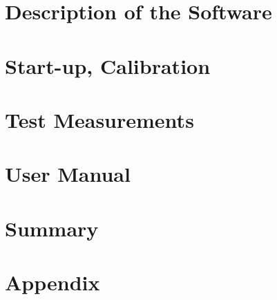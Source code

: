 \documentclass[12pt]{article}
\begin{document}
	\section{Description of the Software}
	
	\section{Start-up, Calibration}
	
	\section{Test Measurements}
	
	\section{User Manual}
	
	\section{Summary}
	
	\begin{thebibliography}{9}
	\end{thebibliography}
	
	\appendix
	\section{Appendix}
	
\end{document}
